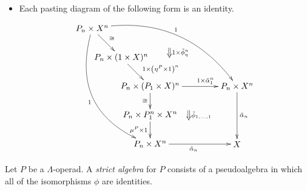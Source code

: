 \begin{Defi}
\begin{itemize}
\[                    {\ar_{\mu^P \times 1} "b02" ; "b04"};
                    {\ar_{\tilde{\alpha}_{\Sigma\Sigma m_{ij}}} "b04" ; "b14"};
                    (50,-100)*+{\scriptstyle P_{\Sigma k_i} \times X^{\Sigma k_i}}="b22";
                    {\ar_{\mu^P \times 1} "b10" ; "b22"};
                    {\ar^>>>>>>>>>>>>>>>>{1 \times \prod\prod \tilde{\alpha}_{m_{ij}}} "b02" ; "b22"};
                    {\ar^{\tilde{\alpha}_{\Sigma k_i}} "b22" ; "b14"};
                    {\ar@{=>}^{1 \times \prod_i \tilde{\phi}_{m_{i1}, \ldots, m_{ik_{i}}}} (35,-8) ; (35,-12)};
                    {\ar@{=>}^{\tilde{\phi}_{\Sigma m_{1j}, \ldots, \Sigma m_{nj}}} (50,-33) ; (50,-37)};
                    {\ar@{=>}^{\tilde{\phi}_{k_1,\ldots,k_n}} (60,-92) ; (60,-96)};
                    {\ar@{=>}^{\tilde{\phi}_{m_{11}, \ldots, m_{nk_n}}} (30,-108) ; (30,-112)};
                    {\ar@{=} (45,-58) ; (45,-62)};
                \endxy
            \]
        \item Each pasting diagram of the following form is an identity.
            \[
                \xy
                    (0,0)*+{P_n \times X^n}="00";
                    (12,-12)*+{P_n \times (1 \times X)^n}="11";
                    (24,-24)*+{P_n \times (P_1 \times X)^n}="22";
                    (60,-24)*+{P_n \times X^n}="32";
                    (60,-48)*+{X}="34";
                    (24,-36)*+{P_n \times P_1^n \times X^n}="23";
                    (24,-48)*+{P_n \times X^n}="24";
                    {\ar@/^2.5pc/^{1} "00" ; "32"};
                    {\ar^{\tilde{\alpha}_n} "32" ; "34"};
                    {\ar^{\cong} "00" ; "11"};
                    {\ar^>>>{1 \times \left(\eta^P \times 1\right)^n} "11" ; "22"};
                    {\ar^>>>>>>{1 \times \tilde{\alpha}_1^n} "22" ; "32"};
                    {\ar@/_3pc/_{1} "00" ; "24"};
                    {\ar_{\cong} "22" ; "23"};
                    {\ar_{\mu^P \times 1} "23" ; "24"};
                    {\ar_{\tilde{\alpha}_n} "24" ; "34"};
                    {\ar@{=>}^{1 \times \tilde{\phi}_\eta^n} (32,-8) ; (32,-12)};
                    {\ar@{=>}^{\tilde{\phi}_{1,\ldots,1}} (40,-34) ; (40,-38)};
                \endxy
            \]
    \end{itemize}

\end{Defi}

\begin{Defi}\label{Defi:strictalgebra-lop}
Let $P$ be a $\Lambda$-operad. A \textit{strict algebra} for $P$ consists of a pseudoalgebra in which all of the isomorphisms $\phi$ are identities.
\end{Defi}

